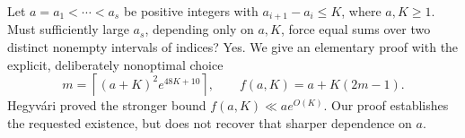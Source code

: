 Let $a=a_1<\cdots<a_s$ be positive integers with $a_{i+1}-a_i\le K$, where $a,K\ge1$. Must sufficiently large $a_s$, depending only on $a,K$, force equal sums over two distinct nonempty intervals of indices? Yes. We give an elementary proof with the explicit, deliberately nonoptimal choice
\[
 m=\left\lceil(a+K)^2e^{48K+10}\right\rceil,\qquad
 f(a,K)=a+K(2m-1).
 \tag{1}
\]
Hegyv\'ari proved the stronger bound $f(a,K)\ll ae^{O(K)}$. Our proof establishes the requested existence, but does not recover that sharper dependence on $a$.
